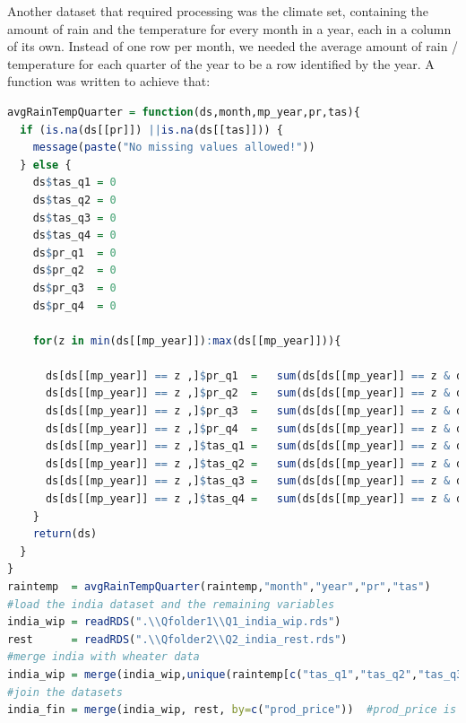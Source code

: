 \documentclass[12pt,a4paper,english]{article}
\begin{document}
Another dataset that required processing was the climate set, containing the amount of rain and the temperature for every month in a year, each in a column of its own. Instead of one row per month, we needed the average amount of rain / temperature for each quarter of the year to be a row identified by the year.
A function was written to achieve that:

\begin{lstlisting}[language= R, captionpos=b,caption=\href{https://github.com/jaidikam/sps_ws1718/tree/master/Qfolder2}{SPL\_Q2\_india\_finalization}]
avgRainTempQuarter = function(ds,month,mp_year,pr,tas){
  if (is.na(ds[[pr]]) ||is.na(ds[[tas]])) {
    message(paste("No missing values allowed!"))
  } else {
    ds$tas_q1 = 0
    ds$tas_q2 = 0
    ds$tas_q3 = 0
    ds$tas_q4 = 0
    ds$pr_q1  = 0
    ds$pr_q2  = 0
    ds$pr_q3  = 0
    ds$pr_q4  = 0
    
    for(z in min(ds[[mp_year]]):max(ds[[mp_year]])){
      
      ds[ds[[mp_year]] == z ,]$pr_q1  =   sum(ds[ds[[mp_year]] == z & ds[[month]] %in% c("1","2","3"),][[pr]])/3
      ds[ds[[mp_year]] == z ,]$pr_q2  =   sum(ds[ds[[mp_year]] == z & ds[[month]] %in% c("4","5","6"),][[pr]])/3
      ds[ds[[mp_year]] == z ,]$pr_q3  =   sum(ds[ds[[mp_year]] == z & ds[[month]] %in% c("7","8","9"),][[pr]])/3
      ds[ds[[mp_year]] == z ,]$pr_q4  =   sum(ds[ds[[mp_year]] == z & ds[[month]] %in% c("10","11","12"),][[pr]])/3
      ds[ds[[mp_year]] == z ,]$tas_q1 =   sum(ds[ds[[mp_year]] == z & ds[[month]] %in% c("1","2","3"),][[tas]])/3
      ds[ds[[mp_year]] == z ,]$tas_q2 =   sum(ds[ds[[mp_year]] == z & ds[[month]] %in% c("4","5","6"),][[tas]])/3
      ds[ds[[mp_year]] == z ,]$tas_q3 =   sum(ds[ds[[mp_year]] == z & ds[[month]] %in% c("7","8","9"),][[tas]])/3
      ds[ds[[mp_year]] == z ,]$tas_q4 =   sum(ds[ds[[mp_year]] == z & ds[[month]] %in% c("10","11","12"),][[tas]])/3
    }
    return(ds)
  }  
}
raintemp  = avgRainTempQuarter(raintemp,"month","year","pr","tas") 
#load the india dataset and the remaining variables
india_wip = readRDS(".\\Qfolder1\\Q1_india_wip.rds")
rest      = readRDS(".\\Qfolder2\\Q2_india_rest.rds")
#merge india with wheater data
india_wip = merge(india_wip,unique(raintemp[c("tas_q1","tas_q2","tas_q3","tas_q4","pr_q1","pr_q2","pr_q3","pr_q4","year")]),by=c("year")) 
#join the datasets
india_fin = merge(india_wip, rest, by=c("prod_price"))  #prod_price is unique, therefore it can be used as a key for the merge
\end{lstlisting}
\end{document}

